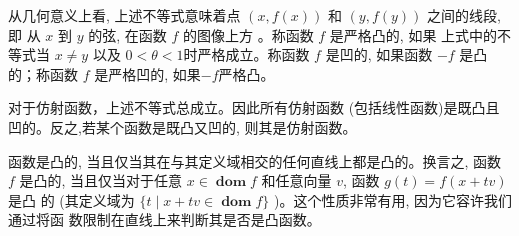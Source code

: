 从几何意义上看, 上述不等式意味着点 $(x, f(x))$ 和 $(y, f(y))$ 之间的线段, 即 从 $x$ 到 $y$ 的弦, 在函数 $f$ 的图像上方 。称函数 $f$ 是严格凸的, 如果 上式中的不等式当 $x \neq y$ 以及 $0<\theta<1$时严格成立。称函数 $f$ 是凹的, 如果函数 $-f$ 是凸的；称函数 $f$ 是严格凹的, 如果$-f$严格凸。

对于仿射函数，上述不等式总成立。因此所有仿射函数 (包括线性函数)是既凸且凹的。反之,若某个函数是既凸又凹的, 则其是仿射函数。

函数是凸的, 当且仅当其在与其定义域相交的任何直线上都是凸的。换言之, 函数 $f$ 是凸的, 当且仅当对于任意 $x \in \operatorname{\textbf{dom}} f$ 和任意向量 $v$, 函数 $g(t)=f(x+t v)$ 是凸 的 (其定义域为 $\{t \mid x+t v \in \operatorname{\textbf{dom}} f\}$ )。这个性质非常有用, 因为它容许我们通过将函 数限制在直线上来判断其是否是凸函数。


